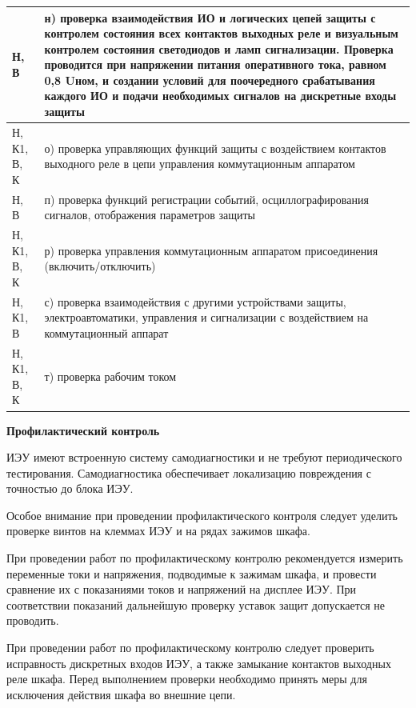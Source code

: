 \begin{longtable}{
  |>{\raggedright\arraybackslash}m{2cm}
  |>{\raggedright\arraybackslash}m{14.8cm}|
}
	   Н, В & н) проверка взаимодействия ИО и логических цепей защиты с контролем состояния всех контактов выходных реле и визуальным контролем состояния светодиодов и ламп сигнализации. Проверка проводится при напряжении питания оперативного тока, равном 0,8 Uном, и создании условий для поочередного срабатывания каждого ИО и подачи необходимых сигналов на дискретные входы защиты \\ \hline
Н, К1, В, К & о) проверка управляющих функций защиты с воздействием контактов выходного реле в цепи управления коммутационным аппаратом \\ \hline
	   Н, В & п) проверка функций регистрации событий, осциллографирования сигналов, отображения параметров защиты \\ \hline
Н, К1, В, К & р) проверка управления коммутационным аппаратом присоединения (включить/отключить) \\ \hline
   Н, К1, В & с) проверка взаимодействия с другими устройствами защиты, электроавтоматики, управления и сигнализации с воздействием на коммутационный аппарат \\ \hline
Н, К1, В, К & т) проверка рабочим током \\ \hline
	   
\end{longtable}
\normalsize
\setlength{\extrarowheight}{0.0cm}

\newpage

\par
\textbf{Профилактический контроль}

\par
ИЭУ имеют встроенную систему самодиагностики и не требуют периодического тестирования. Самодиагностика обеспечивает локализацию повреждения с точностью до блока ИЭУ.

\par
Особое внимание при проведении профилактического контроля следует уделить проверке винтов на клеммах ИЭУ и на рядах зажимов шкафа.

\par
При проведении работ по профилактическому контролю рекомендуется измерить переменные токи и напряжения, подводимые к зажимам шкафа, и провести сравнение их с показаниями токов и напряжений на дисплее ИЭУ. При соответствии показаний дальнейшую проверку уставок защит допускается не проводить.

\par
При проведении работ по профилактическому контролю следует проверить исправность дискретных входов ИЭУ, а также замыкание контактов выходных реле шкафа. Перед выполнением проверки необходимо принять меры для исключения действия шкафа во внешние цепи.


